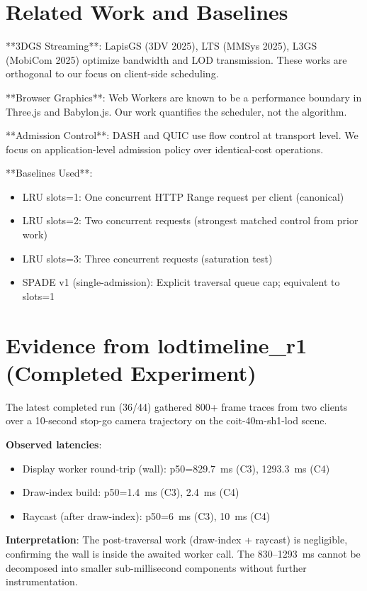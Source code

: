 \documentclass[sigconf,anonymous,review]{acmart}
\begin{document}
\section{Related Work and Baselines}

**3DGS Streaming**: LapisGS (3DV 2025), LTS (MMSys 2025), L3GS (MobiCom 2025) optimize bandwidth and LOD transmission. These works are orthogonal to our focus on client-side scheduling.

**Browser Graphics**: Web Workers are known to be a performance boundary in Three.js and Babylon.js. Our work quantifies the scheduler, not the algorithm.

**Admission Control**: DASH and QUIC use flow control at transport level. We focus on application-level admission policy over identical-cost operations.

**Baselines Used**:
\begin{itemize}
  \item LRU slots=1: One concurrent HTTP Range request per client (canonical)
  \item LRU slots=2: Two concurrent requests (strongest matched control from prior work)
  \item LRU slots=3: Three concurrent requests (saturation test)
  \item SPADE v1 (single-admission): Explicit traversal queue cap; equivalent to slots=1
\end{itemize}

\section{Evidence from lodtimeline\_r1 (Completed Experiment)}

The latest completed run (36/44) gathered 800+ frame traces from two clients over a 10-second stop-go camera trajectory on the coit-40m-sh1-lod scene.

\textbf{Observed latencies}:
\begin{itemize}
  \item Display worker round-trip (wall): p50=829.7~ms (C3), 1293.3~ms (C4)
  \item Draw-index build: p50=1.4~ms (C3), 2.4~ms (C4)
  \item Raycast (after draw-index): p50=6~ms (C3), 10~ms (C4)
\end{itemize}

\textbf{Interpretation}:
The post-traversal work (draw-index + raycast) is negligible, confirming the wall is inside the awaited worker call. The 830--1293~ms cannot be decomposed into smaller sub-millisecond components without further instrumentation.
\end{document}
